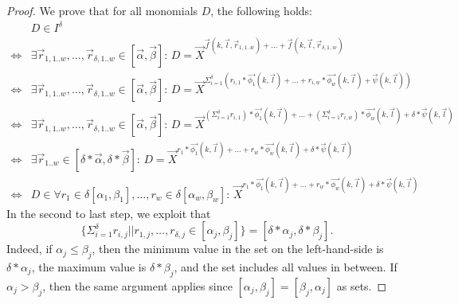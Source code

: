 \begin{proof}
We prove that for all monomials $D$, the following holds:
\begin{align*}
   & D \in I^{\delta} \\
%
{}\Leftrightarrow{} &
  \exists \vec{r}_{1,1..w},\ldots,\vec{r}_{\delta,1..w} \in [\vec{\alpha}, \vec{\beta}]:\,
    D = \vec{X}^{\vec{f}(k,\vec{l},\vec{r}_{1,1..w}) + \ldots + \vec{f}(k,\vec{l},\vec{r}_{\delta,1..w}) } \\
%
{}\Leftrightarrow{} &
  \exists \vec{r}_{1,1..w},\ldots,\vec{r}_{\delta,1..w} \in [\vec{\alpha}, \vec{\beta}]:\,
    D = \vec{X}^{ \Sigma_{i=1}^{\delta} (r_{i,1}*\vec{\phi_1}(k,\vec{l}) + \ldots + r_{i,w}*\vec{\phi_w}(k,\vec{l})
                  + \vec{\psi}(k,\vec{l}))
                } \\
{}\Leftrightarrow{} &
  \exists \vec{r}_{1,1..w},\ldots,\vec{r}_{\delta,1..w} \in [\vec{\alpha}, \vec{\beta}]:\,
    D = \vec{X}^{   (\Sigma_{i=1}^{\delta} r_{i,1})*\vec{\phi_1}(k,\vec{l}) + \ldots
                  + (\Sigma_{i=1}^{\delta} r_{i,w})*\vec{\phi_w}(k,\vec{l})
                  + \delta*\vec{\psi}(k,\vec{l})
                } \\
{}\Leftrightarrow{} &
  \exists \vec{r}_{1..w} \in [\delta * \vec{\alpha}, \delta * \vec{\beta}]:\,
    D = \vec{X}^{   r_{1}*\vec{\phi_1}(k,\vec{l}) + \ldots
                  + r_{w}*\vec{\phi_w}(k,\vec{l})
                  + \delta*\vec{\psi}(k,\vec{l})
                } \\
{}\Leftrightarrow{} &
  D \in \forall r_1 \in \delta[\alpha_1, \beta_1], \ldots, r_w \in \delta[\alpha_w, \beta_w]:\,
    \vec{X}^{r_{1}*\vec{\phi_1}(k,\vec{l}) + \ldots + r_{w}*\vec{\phi_w}(k,\vec{l}) + \delta*\vec{\psi}(k,\vec{l})}
%
\end{align*}
In the second to last step, we exploit that
\[
   \{ \Sigma_{i=1}^{\delta} r_{i,j} | \mid r_{1,j}, \ldots, r_{\delta,j} \in [\alpha_j, \beta_j] \}
   = [\delta*\alpha_j, \delta*\beta_j]\text{.}
\]
Indeed, if $\alpha_j \leq \beta_j$, then the minimum value in the set on the left-hand-side
  is $\delta*\alpha_j$, the maximum value is $\delta*\beta_j$, and the set includes all
  values in between.
If $\alpha_j > \beta_j$, then the same argument applies since $[\alpha_j,\beta_j] = [\beta_j,\alpha_j]$
  as sets.  
\end{proof}
